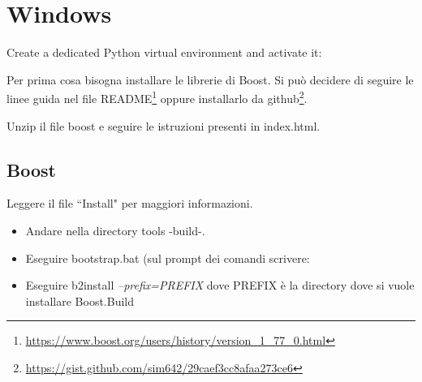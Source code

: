 \medskip


\section{Windows}

\medskip

Create a dedicated Python virtual environment and activate it:

\medskip


\medskip




\medskip

Per prima cosa bisogna installare le librerie di Boost.
Si può decidere di seguire le linee guida nel file README\footnote{\url{https://www.boost.org/users/history/version_1_77_0.html}} oppure installarlo da github\footnote{\url{https://gist.github.com/sim642/29caef3cc8afaa273ce6}}.

\medskip

Unzip il file boost e seguire le istruzioni presenti in index.html.

\medskip

\subsection{Boost}

\medskip


Leggere il file ``Install" per maggiori informazioni.

\medskip

\begin{itemize}
\item Andare nella directory tools -build-.
\item Eseguire bootstrap.bat (sul prompt dei comandi scrivere:  \\ 
\item Eseguire b2install \textit{--prefix=PREFIX} dove PREFIX è la directory dove si vuole installare Boost.Build\\ 
\end{itemize}



